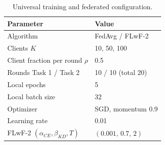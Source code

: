 \begin{table}[h]
\centering
\caption{Universal training and federated configuration.}
\label{tab:config}
\renewcommand{\arraystretch}{1.15}
\begin{tabular}{ll}
\toprule
\textbf{Parameter} & \textbf{Value} \\
\midrule
Algorithm                          & FedAvg / FLwF-2 \\
Clients $K$                        & 10, 50, 100 \\
Client fraction per round $\rho$   & 0.5 \\
Rounds Task 1 / Task 2             & 10 / 10 (total 20) \\
Local epochs                       & 5 \\
Local batch size                   & 32 \\
Optimizer                          & SGD, momentum $0.9$ \\
Learning rate                      & 0.01 \\
FLwF-2 $(\alpha_{CE},\beta_{KD},T)$ & $(0.001,\,0.7,\,2)$ \\
\bottomrule
\end{tabular}
\end{table}
